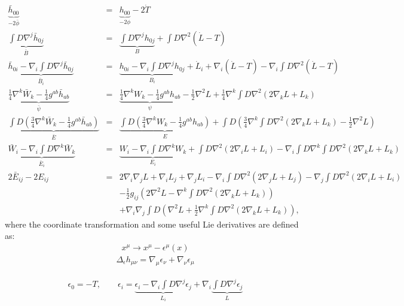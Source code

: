 \documentclass[10pt,letterpaper]{article}
\numberwithin{equation}{section}
\begin{document}
\begin{eqnarray}
\underbrace{\bar h_{00}}_{-2\bar\phi } &=& \underbrace{h_{00}}_{-2\phi} - 2\dot T
\nonumber\\
%
\underbrace{\int D \nabla^j \bar h_{0j}}_{\bar B} &=& \underbrace{\int D \nabla^j h_{0j}}_B + \int D \nabla^2(\dot L-T)
\nonumber\\
%
\underbrace{\bar h_{0i} - \nabla_i \int D \nabla^j \bar h_{0j}}_{\bar B_i} &=&
\underbrace{h_{0i} - \nabla_i \int D \nabla^j  h_{0j}}_{B_i} +\dot L_i + \nabla_i(\dot L -T)
-\nabla_i \int D \nabla^2(\dot L-T)
\nonumber\\
%
\underbrace{\tfrac14 \nabla^k \bar W_k - \tfrac14 g^{ab}\bar h_{ab}}_{\bar\psi} &=& \underbrace{ \tfrac14 \nabla^k W_k - \tfrac14 g^{ab}h_{ab}}_{\psi} - \tfrac12 \nabla^2 L+  \tfrac14 \nabla^k \int D \nabla^2( 2\nabla_k L + L_k) 
\nonumber\\
\underbrace{\int D(\tfrac34 \nabla^k \bar W_k - \tfrac14 g^{ab}\bar h_{ab})}_{\bar E} &=&
\underbrace{\int D(\tfrac34 \nabla^k W_k - \tfrac14 g^{ab}h_{ab})}_{ E} 
+ \int D \left( \tfrac34 \nabla^k \int D \nabla^2 (2\nabla_k L + L_k) - \tfrac12 \nabla^2 L\right)
\nonumber\\
%
\underbrace{\bar W_i - \nabla_i \int D \nabla^k \bar W_k}_{\bar E_i}
&=&
\underbrace{ W_i - \nabla_i \int D \nabla^k W_k}_{ E_i}
+ \int D\nabla^2 (2 \nabla_i L + L_i) - \nabla_i \int D \nabla^k \int D\nabla^2 (2 \nabla_k L + L_k)
\nonumber\\
2\bar E_{ij} - 2E_{ij} &=&2\nabla_i \nabla_j L + \nabla_i L_j + \nabla_j L_i
-\nabla_i \int D\nabla^2 (2\nabla_j L + L_j) - \nabla_j \int D \nabla^2 (2\nabla_i L + L_i)
\nonumber\\
&&-\tfrac12 g_{ij}\left( 2 \nabla^2 L - \nabla^k \int D \nabla^2( 2\nabla_k L + L_k)\right)
\nonumber\\
&& + \nabla_i \nabla_j \int D \left( \nabla^2 L +\tfrac12 \nabla^k \int D \nabla^2 (2\nabla_k L +L_k)\right),
\label{svtgauge1}
\end{eqnarray}
where the coordinate transformation and some useful Lie derivatives are defined as:
\begin{eqnarray}
x^\mu \to x^\mu - \epsilon^\mu(x)
\end{eqnarray}
\begin{eqnarray}
\Delta_\epsilon h_{\mu\nu} = \nabla_\mu \epsilon_\nu + \nabla_\nu \epsilon_\mu
\end{eqnarray}

\begin{eqnarray}
\epsilon_0 = -T,\qquad \epsilon_i = \underbrace{ \epsilon_i - \nabla_i \int D \nabla^j \epsilon_j}_{L_i} + 
\nabla_i \underbrace{ \int D \nabla^j \epsilon_j}_{L} 
\end{eqnarray}
\end{document}
